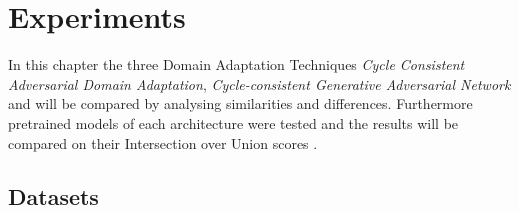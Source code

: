 \chapter{Experiments}
\label{sec:experiments}

In this chapter the three Domain Adaptation Techniques \textit{Cycle Consistent Adversarial Domain Adaptation}, \textit{Cycle-consistent Generative Adversarial Network} and  will be compared by analysing similarities and differences. Furthermore pretrained models of each architecture were tested and the results will be compared on their Intersection over Union scores .


\section{Datasets}

